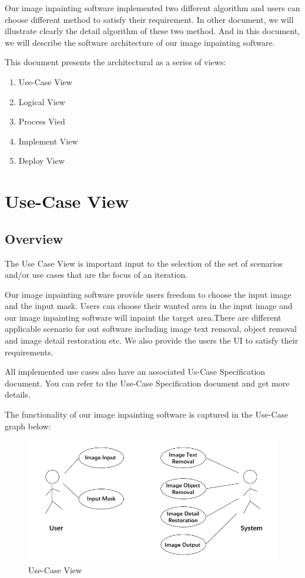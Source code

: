 \documentclass[12pt]{article}
\begin{document}
Our image inpainting software implemented two different algorithm and users can choose different method to satisfy their requirement. In other document, we will illustrate clearly the detail algorithm of these two method. And in this document, we will describe the software architecture of our image inpainting software.

This document presents the architectural as a series of views:

\begin{enumerate}
	\item Use-Case View
	\item Logical View
	\item Process Vied
	\item Implement View
	\item Deploy View
\end{enumerate}


\section{Use-Case View}
\subsection{Overview}
\qquad The Use Case View is important input to the selection of the set of scenarios and/or use cases that are the focus of an iteration. 

Our image inpainting software provide users freedom to choose the input image and the input mask. Users can choose their wanted area in the input image and our image inpainting software will inpaint the target area.There are different applicable scenario for out software including image text removal, object removal and image detail restoration etc. We also provide the users the UI to satisfy their requirements. 

All implemented use cases also have an associated Us-Case Specification document. You can refer to the Use-Case Specification document and get more details.

The functionality of our image inpainting software is captured in the Use-Case graph below:
\begin{figure}[H]
	\centering
	\includegraphics[width=1.0\linewidth]{use-case.jpg}
	\caption{Use-Case View}
\end{figure}
\end{document}
